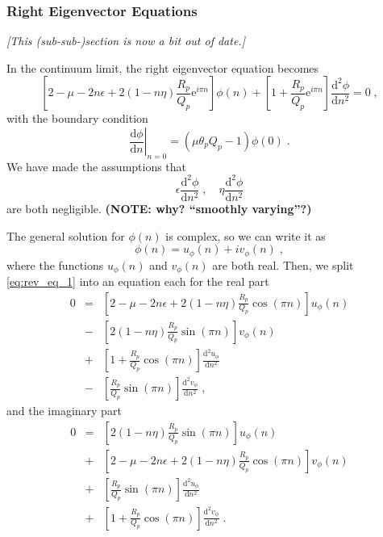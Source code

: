 \documentclass[a4paper,10pt]{article}
\newcommand{\D}{\mathrm{d}}
\newcommand{\e}{\mathrm{e}}
\begin{document}
\subsubsection{Right Eigenvector Equations}

\emph{[This (sub-sub-)section is now a bit out of date.]}

In the continuum limit, the right eigenvector equation becomes
\begin{equation}\label{eq:rev_eq_1}
 \left[ 2 - \mu - 2n\epsilon + 2(1-n\eta) \frac{R_p}{Q_p} \e^{i\pi n} \right] \phi(n)  + \left[ 1 + \frac{R_p}{Q_p} \e^{i\pi n} \right] \frac{\D^2 \phi}{\D n^2} = 0  \;, 
\end{equation}
with the boundary condition
\begin{equation}
  \left. \frac{\D \phi}{\D n} \right|_{n=0} = (\mu \theta_p Q_p - 1) \phi(0) \;. 
\end{equation}
We have made the assumptions that
\begin{equation*}
 \epsilon \frac{\D^2 \phi}{\D n^2} \;, \quad \eta \frac{\D^2 \phi}{\D n^2}
\end{equation*}
are both negligible. {\bf (NOTE: why? ``smoothly varying''?)}

The general solution for $\phi(n)$ is complex, so we can write it as
\begin{equation}
  \phi(n) = u_\phi(n) + iv_\phi(n) \;, 
\end{equation}
where the functions $u_\phi(n)$ and $v_\phi(n)$ are both real. Then, we split \eqref{eq:rev_eq_1} into an equation each for the real part 
\begin{eqnarray}
  0 & = & \left[ 2 - \mu - 2n\epsilon + 2(1-n\eta) \frac{R_p}{Q_p} \cos(\pi n) \right] u_\phi(n) \nonumber \\
    & - & \left[  2(1-n\eta)\frac{R_p}{Q_p} \sin(\pi n) \right] v_\phi(n) \nonumber \\
    & + & \left[ 1 + \frac{R_p}{Q_p} \cos(\pi n) \right] \frac{\D^2 u_\phi}{\D n^2} \nonumber \\
    & - & \left[ \frac{R_p}{Q_p} \sin(\pi n) \right] \frac{\D^2 v_\phi}{\D n^2} \;, 
\end{eqnarray}
and the imaginary part
\begin{eqnarray}
  0 & = & \left[  2(1-n\eta)\frac{R_p}{Q_p} \sin(\pi n) \right]  u_\phi(n)  \nonumber \\
    & + & \left[ 2 - \mu - 2n\epsilon + 2(1-n\eta) \frac{R_p}{Q_p} \cos(\pi n) \right] v_\phi(n) \nonumber \\
    & + & \left[ \frac{R_p}{Q_p} \sin(\pi n) \right] \frac{\D^2 u_\phi}{\D n^2} \nonumber \\
    & + & \left[ 1 + \frac{R_p}{Q_p} \cos(\pi n) \right] \frac{\D^2 v_\phi}{\D n^2} \;.
\end{eqnarray}
\end{document}
